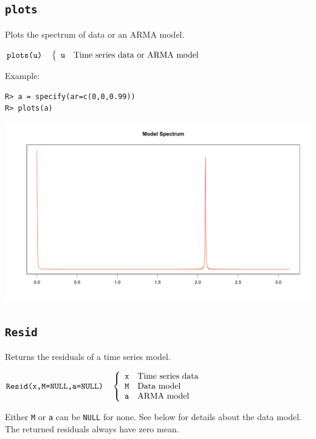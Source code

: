 \documentclass[11pt]{article}
\begin{document}
\subsection{\tt plots}
Plots the spectrum of data or an ARMA model.

\bigskip
$
\hbox{\tt plots(u)}\quad\left\{\begin{array}{ll}
{\tt u} & \hbox{Time series data or ARMA model}
\end{array}\right.
$

\bigskip
\noindent
Example:

\begin{verbatim}
R> a = specify(ar=c(0,0,0.99))
R> plots(a)
\end{verbatim}

\begin{center}
\includegraphics[scale=0.3]{Rplot-23.pdf}
\end{center}

\newpage

\subsection{\tt Resid}
Returns the residuals of a time series model.

\bigskip
$
\hbox{\tt Resid(x,M=NULL,a=NULL)}\quad\left\{\begin{array}{ll}
{\tt x} & \hbox{Time series data}\\
{\tt M} & \hbox{Data model}\\
{\tt a} & \hbox{ARMA model}
\end{array}\right.
$

\bigskip
\noindent
Either {\tt M} or {\tt a} can be {\tt NULL} for none.
See below for details about the data model.
The returned residuals always have zero mean.
\end{document}
